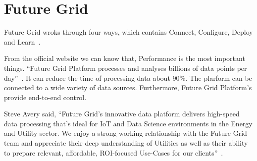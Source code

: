 \section{Future Grid}

Future Grid wroks through four ways, which contains Connect,
Configure, Deploy and Learn~\cite{www-futuregrid}.


From the official website we can know that, Performance is the 
most important things. ``Future Grid Platform processes and analyses
billions of data points per day''~\cite{www-futuregrid}. It can 
reduce the time of processing data about 90\%. The plarform can be 
connected to a wide variety of data sources. Furthermore, Future 
Grid Platform's provide end-to-end control.


Steve Avery said, ``Future Grid's innovative data platform delivers
high-speed data processing that's ideal for IoT and Data Science 
environments in the Energy and Utility sector. We enjoy a strong 
working relationship with the Future Grid team and appreciate their 
deep understanding of Utilities as well as their ability to prepare 
relevant, affordable, ROI-focused Use-Cases for our clients''~\cite{www-futuregrid}. 

